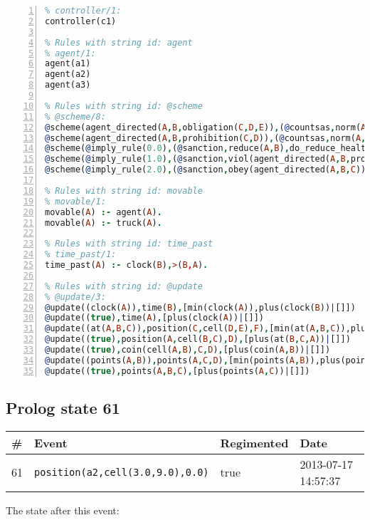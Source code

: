 \documentclass[11pt]{article}\usepackage[utf8]{inputenc}\usepackage{geometry}
\begin{document}
\begin{lstlisting}[language=Prolog, numbers=left]
% Rules with string id: controller
% controller/1:
controller(c1)

% Rules with string id: agent
% agent/1:
agent(a1)
agent(a2)
agent(a3)

% Rules with string id: @scheme
% @scheme/8:
@scheme(agent_directed(A,B,obligation(C,D,E)),(@countsas,norm(A,B,F,obligation(C,D,E)),F),false,(listTrue(C)),(time_past(D)),false,[plus(viol(agent_directed(A,B,obligation(C,D,E))))|[]],[plus(obey(agent_directed(A,B,obligation(C,D,E))))|[]])
@scheme(agent_directed(A,B,prohibition(C,D)),(@countsas,norm(A,B,E,prohibition(C,D)),E),(listTrue(C)),false,(false),false,[plus(viol(agent_directed(A,B,prohibition(C,D))))|[]],[plus(obey(agent_directed(A,B,prohibition(C,D))))|[]])
@scheme(@imply_rule(0.0),(@sanction,reduce(A,B),do_reduce_health(A,B),notifyAgent(A,changed(status))),true,false,false,false,[min(reduce(A,B))|[]],[])
@scheme(@imply_rule(1.0),(@sanction,viol(agent_directed(A,B,prohibition(C,D))),do_sanction(D)),true,false,false,false,[min(viol(agent_directed(A,B,prohibition(C,D))))|[]],[])
@scheme(@imply_rule(2.0),(@sanction,obey(agent_directed(A,B,C))),true,false,false,false,[min(obey(agent_directed(A,B,C)))|[]],[])

% Rules with string id: movable
% movable/1:
movable(A) :- agent(A).
movable(A) :- truck(A).

% Rules with string id: time_past
% time_past/1:
time_past(A) :- clock(B),>(B,A).

% Rules with string id: @update
% @update/3:
@update((clock(A)),time(B),[min(clock(A)),plus(clock(B))|[]])
@update((true),time(A),[plus(clock(A))|[]])
@update((at(A,B,C)),position(C,cell(D,E),F),[min(at(A,B,C)),plus(at(D,E,C))|[]])
@update((true),position(A,cell(B,C),D),[plus(at(B,C,A))|[]])
@update((true),coin(cell(A,B),C,D),[plus(coin(A,B))|[]])
@update((points(A,B)),points(A,C,D),[min(points(A,B)),plus(points(A,D))|[]])
@update((true),points(A,B,C),[plus(points(A,C))|[]])

\end{lstlisting}
\clearpage 
\subsection{Prolog state 61}
\begin{table}[ht]
\centering 
\begin{tabular}{l l l l} 
\textbf{\#} & \textbf{Event} & \textbf{Regimented} & \textbf{Date} \\ [0.5ex] 
\hline
61&\texttt{position(a2,cell(3.0,9.0),0.0)}&true&2013-07-17 14:57:37\\ [1ex] \hline\end{tabular}
\end{table}
The state after this event:
\end{document}
